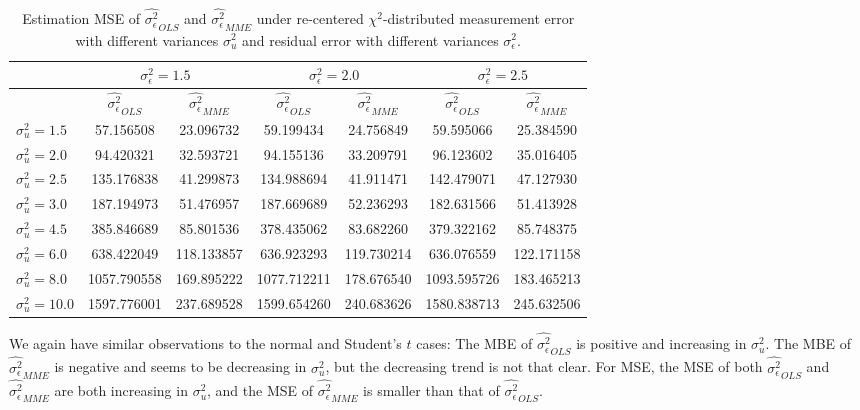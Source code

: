 \documentclass{article}
\begin{document}
\begin{table}[ht]
    \centering
    \caption{Estimation MSE of $\hat{\sigma^2_\epsilon}_{OLS}$ and $\hat{\sigma^2_\epsilon}_{MME}$ under re-centered $\chi^2$-distributed measurement error with different variances $\sigma^2_u$ and residual error with different variances $\sigma^2_\epsilon$.}
    \label{Tab:MSE_sigma_chi}
    \begin{tabular}[t]{lcccccc}
        \hline
        &\multicolumn{2}{c}{$\sigma^2_\epsilon=1.5$}&\multicolumn{2}{c}{$\sigma^2_\epsilon=2.0$}&\multicolumn{2}{c}{$\sigma^2_\epsilon=2.5$}\\
        \hline
        &$\hat{\sigma^2_\epsilon}_{OLS}$&$\hat{\sigma^2_\epsilon}_{MME}$&$\hat{\sigma^2_\epsilon}_{OLS}$&
        $\hat{\sigma^2_\epsilon}_{MME}$&$\hat{\sigma^2_\epsilon}_{OLS}$&$\hat{\sigma^2_\epsilon}_{MME}$\\
        \hline
        $\sigma^2_u = 1.5$&57.156508&23.096732&59.199434&24.756849&59.595066&25.384590\\
        $\sigma^2_u = 2.0$&94.420321&32.593721&94.155136&33.209791&96.123602&35.016405\\
        $\sigma^2_u = 2.5$&135.176838&41.299873&134.988694&41.911471&142.479071&47.127930\\
        $\sigma^2_u = 3.0$&187.194973&51.476957&187.669689&52.236293&182.631566&51.413928\\
        $\sigma^2_u = 4.5$&385.846689&85.801536&378.435062&83.682260&379.322162&85.748375\\
        $\sigma^2_u = 6.0$&638.422049&118.133857&636.923293&119.730214&636.076559&122.171158\\
        $\sigma^2_u = 8.0$&1057.790558&169.895222&1077.712211&178.676540&1093.595726&183.465213\\
        $\sigma^2_u = 10.0$&1597.776001&237.689528&1599.654260&240.683626&1580.838713&245.632506\\
        \hline
    \end{tabular}
\end{table}

We again have similar observations to the normal and Student's $t$ cases:
The MBE of $\hat{\sigma^2_\epsilon}_{OLS}$ is positive and increasing in $\sigma^2_u$.
The MBE of $\hat{\sigma^2_\epsilon}_{MME}$ is negative and seems to be decreasing in $\sigma^2_u$, but the decreasing trend is not that clear.
For MSE, the MSE of both $\hat{\sigma^2_\epsilon}_{OLS}$ and $\hat{\sigma^2_\epsilon}_{MME}$ are both increasing in $\sigma^2_u$, and the MSE of $\hat{\sigma^2_\epsilon}_{MME}$ is smaller than that of $\hat{\sigma^2_\epsilon}_{OLS}$. 
\end{document}
